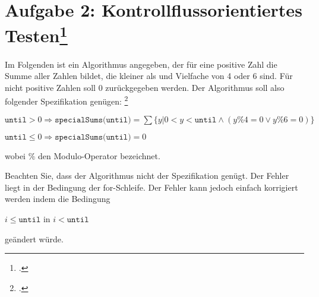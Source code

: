 \documentclass{lehramt-informatik-minimal}
\begin{document}
\section{Aufgabe 2: Kontrollflussorientiertes Testen\footcite{sosy:ab:7}}

Im Folgenden ist ein Algorithmus angegeben, der für eine positive Zahl
 die Summe aller Zahlen bildet, die kleiner als 
und Vielfache von 4 oder 6 sind. Für nicht positive Zahlen soll 0
zurückgegeben werden. Der Algorithmus soll also folgender Spezifikation
genügen:
\footcite[Herbst 2014 (66116) - Thema 2 Teilaufgabe 2, Aufgabe 3]{examen:66116:2014:09}

\bigskip

{\footnotesize
\noindent
$\texttt{until} > 0 \Rightarrow \texttt{specialSums(until)} =
\sum \{y | 0 < y < \texttt{until} \land (y\%4 = 0 \lor y\%6 = 0)\}$

\noindent
$\texttt{until} \leq 0 \Rightarrow \texttt{specialSums(until)} = 0$
}

\bigskip\noindent
wobei $\%$ den Modulo-Operator bezeichnet.


\noindent
Beachten Sie, dass der Algorithmus nicht der Spezifikation genügt. Der
Fehler liegt in der Bedingung der for-Schleife. Der Fehler kann jedoch
einfach korrigiert werden indem die Bedingung

\begin{center}
$i \leq \texttt{until}$ in $i < \texttt{until}$
\end{center}

geändert würde.
\end{document}
